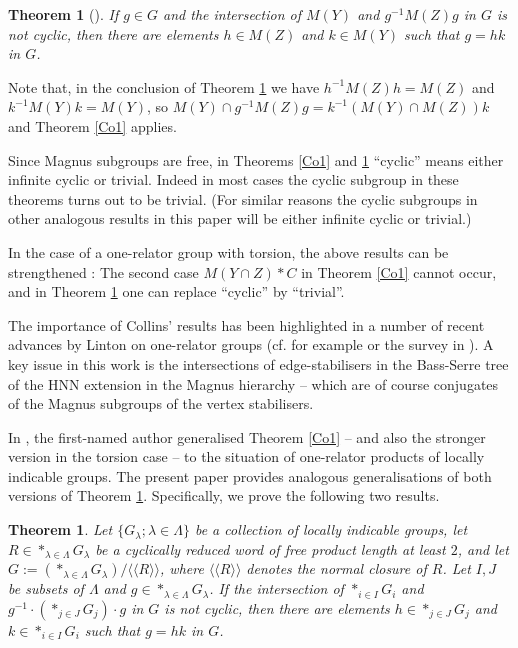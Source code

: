 \documentclass[12pt,a4paper]{amsart}
\def\<{\langle}
\def\>{\rangle}
\newtheorem{thmA}{Theorem}
\newtheorem{thm}{Theorem}[section]
\begin{document}
\begin{thm}[\cite{C2}]\label{Co2}
	If $g\in G$ and the intersection of $M(Y)$ and $g^{-1}M(Z)g$ in $G$ is not cyclic, then there are elements $h\in M(Z)$ and $k\in M(Y)$ such that $g=hk$ in $G$.
\end{thm}

Note that, in the conclusion of Theorem \ref{Co2} we have $h^{-1}M(Z)h=M(Z)$ and $k^{-1}M(Y)k=M(Y)$, so $M(Y)\cap g^{-1}M(Z)g=k^{-1}(M(Y)\cap M(Z))k$ and Theorem \ref{Co1} applies.

 Since Magnus subgroups are free, in Theorems \ref{Co1} and \ref{Co2} ``cyclic'' means either infinite cyclic or trivial.  Indeed in most cases the cyclic subgroup in these theorems turns out to be trivial. (For similar reasons the cyclic subgroups in other analogous results in this paper will be either infinite cyclic or trivial.)  

In the case of a one-relator group with torsion, the above results can be strengthened \cite{C1}: The second case $M(Y\cap Z)*C$ in Theorem \ref{Co1} cannot occur, and in Theorem \ref{Co2} one can replace ``cyclic'' by ``trivial''.
 
The importance of Collins' results has 
been highlighted in a number of recent advances by Linton on one-relator groups (cf. for example \cite{L1,L2} or
 the survey in \cite[Chapter 2]{LN}).  
A key issue in this work is the intersections of edge-stabilisers in the Bass-Serre tree of the HNN extension in the Magnus hierarchy -- which are of course conjugates of the Magnus subgroups of the vertex stabilisers.  


In \cite{H05}, the first-named author generalised Theorem \ref{Co1} -- and also the stronger version in the torsion case -- to the situation of one-relator products of locally indicable groups.
The present paper provides analogous generalisations of both versions of Theorem \ref{Co2}.  Specifically, we prove the following two results.


\begin{thmA}\label{main}
	Let $\{G_\lambda;\lambda\in\Lambda\}$ be a collection of locally indicable groups, let $R\in \ast_{\lambda\in\Lambda} G_\lambda$ be a cyclically reduced word of free product length at least $2$, and let $G:=(\ast_{\lambda\in\Lambda} G_\lambda)/\<\<R\>\>$, where $\<\<R\>\>$ denotes the normal closure of $R$.  Let $I,J$ be subsets of $\Lambda$ and $g\in \ast_{\lambda\in\Lambda} G_\lambda$.  If the intersection of $\ast_{i\in I} G_i$ and
	$g^{-1}\cdot\left(\ast_{j\in J} G_j\right)\cdot g$
	in $G$ is not cyclic, then there are elements $h\in \ast_{j\in J} G_j$ and $k\in \ast_{i\in I} G_i$ such that $g=hk$ in $G$.
\end{thmA}
\end{document}
